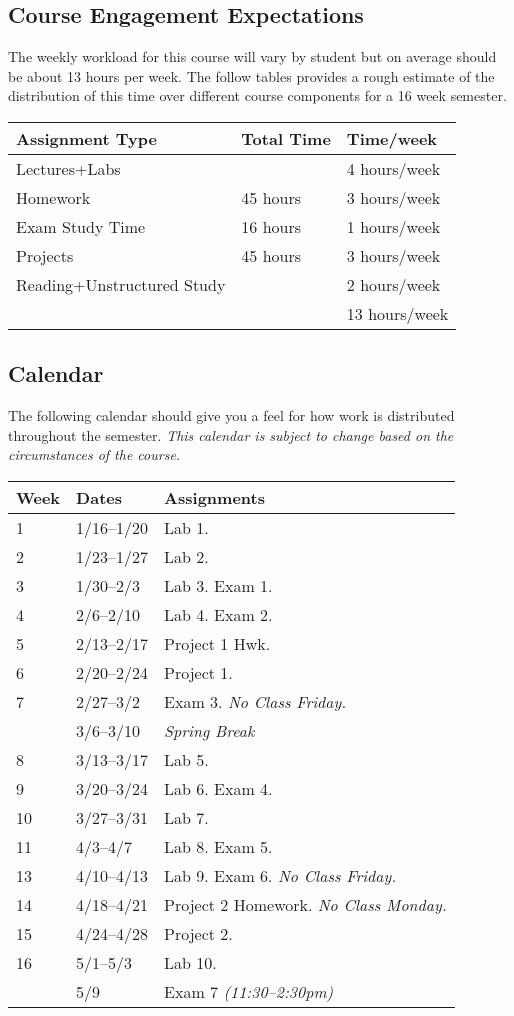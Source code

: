 \documentclass[10pt]{article}
\begin{document}
\subsection{Course Engagement Expectations}

The weekly workload for this course will vary by student but on average should be about 13 hours per week.  The follow tables provides a rough estimate of the distribution of this time over different course components for a 16 week semester.
\begin{center}
\begin{tabular}{lll}
Assignment Type & Total Time & Time/week \\ \toprule
Lectures+Labs &      & 4 hours/week \\
Homework & 45 hours        & 3 hours/week \\
Exam Study Time & 16 hours  & 1 hours/week \\
Projects & 45 hours        & 3 hours/week \\
Reading+Unstructured Study & & 2 hours/week \\
\bottomrule
& & 13 hours/week
\end{tabular}
\end{center}

\subsection{Calendar}

The following calendar should give you a feel for how work is distributed throughout the semester.  \textit{This calendar is subject to change based on the circumstances of the course.}

\begin{center}
\begin{tabular}{lll}
Week & Dates & Assignments \\ \toprule
1 & 1/16--1/20 &  Lab 1.  \\
2 & 1/23--1/27 & Lab 2.   \\
3 & 1/30--2/3 & Lab 3. Exam 1. \\
4 & 2/6--2/10 & Lab 4. Exam 2.\\
5 & 2/13--2/17 & Project 1 Hwk. \\
6 & 2/20--2/24 & Project 1. \\
7 & 2/27--3/2 & Exam 3.
\textit{No Class Friday.} \\
  & 3/6--3/10 & \textit{Spring Break} \\
8 & 3/13--3/17 & Lab 5. \\
9 & 3/20--3/24 & Lab 6. Exam 4. \\
10 & 3/27--3/31 & Lab 7.  \\
11 & 4/3--4/7 & Lab 8. Exam 5.  \\
13 & 4/10--4/13 & Lab 9. Exam 6. \textit{No Class Friday.}   \\
14 & 4/18--4/21 & Project 2 Homework. \textit{No Class Monday.}    \\
15 & 4/24--4/28 &  Project 2. \\
16 & 5/1--5/3 & Lab 10.  \\ \midrule
  & 5/9 & Exam 7 \textit{(11:30--2:30pm)}  \\
\end{tabular}
\end{center}
\end{document}
